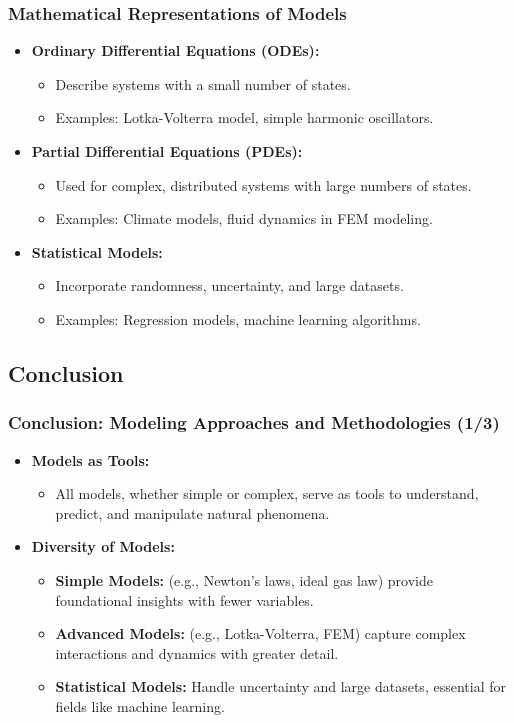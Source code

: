 \documentclass{beamer}
\begin{document}
\begin{frame}
\frametitle{Mathematical Representations of Models}
\begin{itemize}
    \item \textbf{Ordinary Differential Equations (ODEs):}
    \begin{itemize}
        \item Describe systems with a small number of states.
        \item Examples: Lotka-Volterra model, simple harmonic oscillators.
    \end{itemize}
    
    \item \textbf{Partial Differential Equations (PDEs):}
    \begin{itemize}
        \item Used for complex, distributed systems with large numbers of states.
        \item Examples: Climate models, fluid dynamics in FEM modeling.
    \end{itemize}
    
    \item \textbf{Statistical Models:}
    \begin{itemize}
        \item Incorporate randomness, uncertainty, and large datasets.
        \item Examples: Regression models, machine learning algorithms.
    \end{itemize}
\end{itemize}
\end{frame}

\subsection{Conclusion}

\begin{frame}
\frametitle{Conclusion: Modeling Approaches and Methodologies (1/3)}
\begin{itemize}
    \item \textbf{Models as Tools:} 
    \begin{itemize}
        \item All models, whether simple or complex, serve as tools to understand, predict, and manipulate natural phenomena.
    \end{itemize}
    
    \item \textbf{Diversity of Models:} 
    \begin{itemize}
        \item \textbf{Simple Models:} (e.g., Newton's laws, ideal gas law) provide foundational insights with fewer variables.
        \item \textbf{Advanced Models:} (e.g., Lotka-Volterra, FEM) capture complex interactions and dynamics with greater detail.
        \item \textbf{Statistical Models:} Handle uncertainty and large datasets, essential for fields like machine learning.
    \end{itemize}
\end{itemize}
\end{frame}
\end{document}
